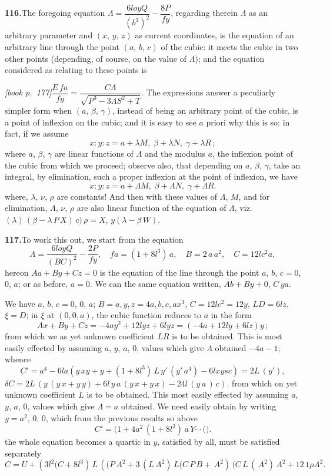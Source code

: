 \documentclass[11pt,a4paper]{article}
\begin{document}
\medskip\noindent\textbf{116.}\quad The foregoing equation $\Lambda = \dfrac{6loy Q}{(b^3)^2} - \dfrac{8P}{f y}$, regarding therein $\Lambda$ as an arbitrary parameter and $(x,\,y,\,z)$ as current coordinates, is the equation of an arbitrary line through the point $(a,\,b,\,c)$ of the cubic: it meets the cubic in two other points (depending, of course, on the value of $\Lambda$); and the equation considered as relating to these points is

\medskip\noindent\textit{[book p.~177]}\quad $\dfrac{E\,fa}{f y} = \dfrac{C\Lambda}{\sqrt{P^3 - 3\Lambda S^2 + T}}$. The expressions answer a peculiarly simpler form when $(a,\,\beta,\,\gamma)$, instead of being an arbitrary point of the cubic, is a point of inflexion on the cubic; and it is easy to see $a$ priori why this is so: in fact, if we assume
\[
x : y : z = a + \lambda M,\;\beta + \lambda N,\;\gamma + \lambda R\,;
\]
where $a$, $\beta$, $\gamma$ are linear functions of $\Lambda$ and the modulus $a$, the inflexion point of the cubic from which we proceed; observe also, that depending on $a$, $\beta$, $\gamma$, take an integral, by elimination, such a proper inflexion at the point of inflexion, we have
\[
x : y : z = a + \Lambda M,\;\beta + \Lambda N,\;\gamma + \Lambda R.
\]
where, $\lambda$, $\nu$, $\rho$ are constants! And then with these values of $\Lambda$, $M$, and for elimination, $\Lambda$, $\nu$, $\rho$ are also linear function of the equation of $\Lambda$, viz. $(\lambda)\,(\beta - \lambda\,P\,X)\,c)\,\rho = X$, $y(\lambda - \beta\,W)$.

\medskip\noindent\textbf{117.}\quad To work this out, we start from the equation
\[
\Lambda = \dfrac{6loy Q}{(B C)^2} - \dfrac{2 P}{f y},\quad fa = (1 + 8l^3)\,a,\quad B = 2\,a\,a^2,\quad C = 12lc^2 a,
\]
hereon $A a + B y + C z = 0$ is the equation of the line through the point $a$, $b$, $c = 0$, $0$, $a$; or as before, $a = 0$. We can the same equation written, $A b + B y + 0$, $C\,y a$.

We have $a$, $b$, $c = 0$, $0$, $a$; $B = a, y, z = 4a, b, c, ax^3$, $C = 12lc^2 = 12y$, $LD = 6lz$, $\xi = D$; in $\xi$ at $(0, 0, a)$, the cubic function reduces to $a$ in the form
\[
A x + By + Cz = -4ay^2 + 12lyz + 6lyz = (-4a + 12ly + 6lz)y\,;
\]
from which we as yet unknown coefficient $LR$ is to be obtained. This is most easily effected by assuming $a$, $y$, $a$, $0$, values which give $\Lambda$ obtained $-4a - 1$; whence
\[
C' = a^4 - 6la(y \,xy + y + (1 + 8l^3)\,L\,y'\,(y'\,a^4) - 6 lxy s c) = 2L\,(y') ,
\]
$\delta C = 2L\,(y\,(y\,x + y\,y) + 6l\,y\,a\,(y\,x + y\,x) - 24l\,(y\,a\,)\,c)$.
from which on yet unknown coefficient $L$ is to be obtained. This most easily effected by assuming $a$, $y$, $a$, $0$, values which give $\Lambda = a$ obtained. We need easily obtain by writing $y = a^2$, $0$, $0$, which from the previous results so above
\[
C' = (1 + 4 a^2\,(1 + 8l^3)\,a\,Y \cdots\,(\bigr).
\]
the whole equation becomes a quartic in $y$, satisfied by all, must be satisfied separately
\[
C = U + (3l^2\bigl(C + 8l^3)\,L\,(\bigl(P\,A^2 + 3\,(L\,A^2)\,L\bigl(C\,P\,B + \,A^2)\,\bigl(C\,L\,(\,A^2)\,A^2 + 12\,1{\rho}A^2.
\]
\end{document}

